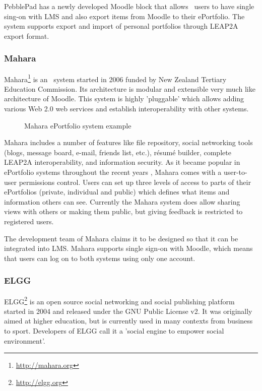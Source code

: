 PebblePad has a newly developed Moodle block that allows \ep~users to
have single sing-on with LMS and also export items from Moodle to their
ePortfolio. The system supports export and import of personal portfolios through
LEAP2A export format.
 
\subsubsection{Mahara}
Mahara\footnote{\url{http://mahara.org}} is an \ep~system started in 2006
funded by New Zealand Tertiary Education Commission. Its architecture is modular
and extensible very much like architecture of Moodle. This system is highly
'pluggable' which allows adding various Web 2.0 web services and establish
interoperability with other systems.

\begin{figure}[htb]
\centering
\setlength\fboxsep{0pt}
\setlength\fboxrule{0.5pt}
\caption{Mahara ePortfolio system example}
\label{fig:maharaep}
\end{figure}

Mahara includes a number of features like file repository, social networking
tools (blogs, message board, e-mail, friends list, etc.), résumé builder,
complete LEAP2A interoperability, and information security. As it became popular
in ePortfolio systems throughout the recent years \citep{Waters2009},
Mahara comes with a user-to-user permissions control. Users can set up three
levels of access to parts of their ePortfolios (private, individual and public)
which defines what items and information others can see. Currently the Mahara
system does allow sharing views with others or making them public, but giving
feedback is restricted to registered users. 

The development team of Mahara claims it to be designed so that it can be
integrated into LMS. Mahara supports single sign-on with Moodle, which means
that users can log on to both systems using only one account.

\subsubsection{ELGG}
ELGG\footnote{\url{http://elgg.org}} is an open source social networking and
social publishing platform started in 2004 and released under the GNU Public
License v2. It was originally aimed at higher education, but is currently used
in many contexts from business to sport. Developers of ELGG call it a 'social
engine to empower social environment'.

